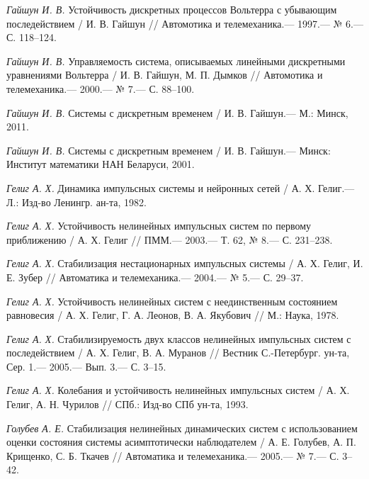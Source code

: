\begin{thebibliography}{10}
	{\it Гайшун И. В.} Устойчивость дискретных процессов Вольтерра с убывающим последействием /
	И. В. Гайшун // Автомотика и телемеханика.— 1997.— № 6.— С. 118–124.
	
	{\it Гайшун И. В.} Управляемость система, описываемых линейными дискретными уравнениями Вольтерра /
	И. В. Гайшун, М. П. Дымков // Автомотика и телемеханика.— 2000.— № 7.— С. 88–100.
	
	{\it Гайшун И. В.} Системы с дискретным временем /
	И. В. Гайшун.— М.: Минск, 2011.
	
	
	{\it Гайшун И. В.} Системы с дискретным временем /
	И. В. Гайшун.— Минск: Институт математики НАН Беларуси, 2001.
	
	{\it Гелиг А. Х.} Динамика импульсных системы и нейронных сетей /
	А. Х. Гелиг.— Л.: Изд-во Ленингр. ан-та, 1982.
	
	{\it Гелиг А. Х.} Устойчивость нелинейных импульсных систем по первому приближению /
	А. Х. Гелиг // ПММ.— 2003.— Т. 62, № 8.— С. 231–238.
	
	{\it Гелиг А. Х.} Стабилизация нестационарных импульсных системы /
	А. Х. Гелиг, И. Е. Зубер // Автоматика и телемеханика.— 2004.— № 5.— С. 29–37.
	
	{\it Гелиг А. Х.} Устойчивость нелинейных систем с неединственным состоянием равновесия /
	А. Х. Гелиг, Г. А. Леонов, В. А. Якубович // М.: Наука, 1978.
	
	{\it Гелиг А. Х.} Стабилизируемость двух классов нелинейных импульсных систем с последействием /
	А. Х. Гелиг, В. А. Муранов // Вестник С.-Петербург. ун-та, Сер. 1.— 2005.— Вып. 3.— С. 3–15.
	
	{\it Гелиг А. Х.} Колебания и устойчивость нелинейных импульсных систем /
	А. Х. Гелиг, А. Н. Чурилов // СПб.: Изд-во СПб ун-та, 1993.
	
	{\it Голубев А. Е.} Стабилизация нелинейных динамических систем с использованием оценки состояния системы асимптотически наблюдателем / А. Е. Голубев, А. П. Крищенко, С. Б. Ткачев // Автоматика и телемеханика.— 2005.— № 7.— С. 3–42.
	

\end{thebibliography}
